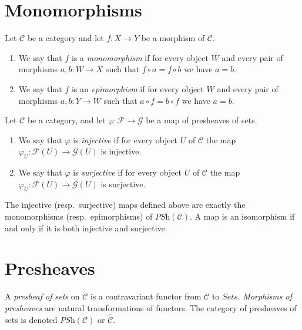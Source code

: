 \section{Monomorphisms}
\label{section-monom-epimo}

\begin{definition}
\label{definition-mono-epi}
Let $\mathcal{C}$ be a category and let $f :
X \to Y$ be
a morphism of $\mathcal{C}$.
\begin{enumerate}
\item We say that $f$ is a {\it monomorphism}
if for every object
$W$ and every pair of morphisms $a, b : W \to
X$ such that
$f \circ a = f \circ b$ we have $a = b$.
\item We say that $f$ is an {\it epimorphism}
if for every object
$W$ and every pair of morphisms $a, b : Y \to
W$ such that
$a \circ f = b \circ f$ we have $a = b$.
\end{enumerate}
\end{definition}

\begin{definition}
\label{definition-presh-injec-surje}
Let $\mathcal{C}$ be a category, and let
$\varphi : \mathcal{F}
\to \mathcal{G}$ be a map of presheaves of
sets.
\begin{enumerate}
\item We say that $\varphi$ is {\it
injective} if for every object
$U$ of $\mathcal{C}$ the map $\varphi_U :
\mathcal{F}(U)
\to \mathcal{G}(U)$ is injective.
\item We say that $\varphi$ is {\it
surjective} if for every object
$U$ of $\mathcal{C}$ the map $\varphi_U :
\mathcal{F}(U)
\to \mathcal{G}(U)$ is surjective.
\end{enumerate}
\end{definition}

\begin{lemma}
\label{lemma-mono-epi}
The injective (resp.\ surjective) maps
defined above
are exactly the monomorphisms (resp.\
epimorphisms) of
$\textit{PSh}(\mathcal{C})$. A map is an
isomorphism
if and only if it is both injective and
surjective.
\end{lemma}

\section{Presheaves}
\label{section-presheaves}

\begin{definition}
\label{definition-presheaves-sets}
A {\it presheaf of sets} on $\mathcal{C}$ is
a contravariant
functor from $\mathcal{C}$ to
$\textit{Sets}$. {\it Morphisms
of presheaves} are natural transformations of
functors.
The category
of presheaves of sets is denoted
$\textit{PSh}(\mathcal{C})$
or $\hat{\mathcal{C}}$.
\end{definition}

